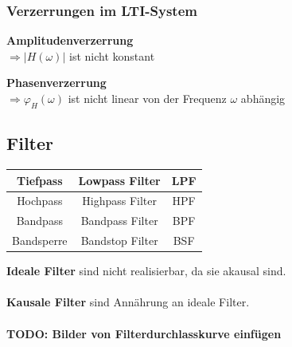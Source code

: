 	\subsubsection{Verzerrungen im LTI-System}
		\begin{minipage}[t]{7cm}
			\textbf{Amplitudenverzerrung}\\
				$\Rightarrow |H(\omega)|$ ist nicht konstant 
				
		\end{minipage}
		\begin{minipage}[t]{10cm}
			\textbf{Phasenverzerrung}\\
				$\Rightarrow \varphi_H (\omega)$ ist nicht linear von der Frequenz $\omega$ abhängig
		\end{minipage}


	\subsection{Filter }
		\begin{multicols}{2}
			\begin{center}
				\begin{tabular}{|c|c|c|}
					\hline
					Tiefpass & Lowpass Filter & LPF \\
					\hline
					Hochpass & Highpass Filter & HPF \\
					\hline
					Bandpass & Bandpass Filter & BPF \\
					\hline
					Bandsperre & Bandstop Filter & BSF \\
					\hline
				\end{tabular}
			\end{center}
		\columnbreak

		\textbf{Ideale Filter} sind nicht realisierbar, da sie akausal sind.\\ \\
		\textbf{Kausale Filter} sind Ann\"ahrung an ideale Filter. \\ \\
		\textbf{TODO: Bilder von Filterdurchlasskurve einfügen}
	\end{multicols}

